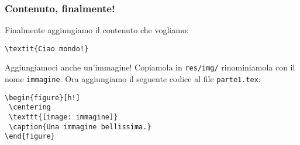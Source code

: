 \begin{frame}[fragile]
 
 \frametitle{Contenuto, finalmente!}
 
 Finalmente aggiungiamo il contenuto che vogliamo:
 
 \begin{lstlisting}[frame = single, title={File res/sections/parte1.tex}]
\textit{Ciao mondo!}
 \end{lstlisting}
 
 Aggiungiamoci anche un'immagine!
 Copiamola in \texttt{res/img/} rinominiamola con il nome \texttt{immagine}. 
Ora aggiungiamo il seguente codice al file \texttt{parte1.tex}:

 \begin{lstlisting}[frame = single]
\begin{figure}[h!]
 \centering
 \texttt{[image: immagine]}
 \caption{Una immagine bellissima.}
\end{figure}
 \end{lstlisting}


\end{frame}
